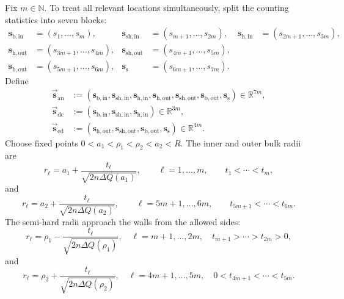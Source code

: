 \documentclass[a4paper]{article}
\newcommand{\R}{\mathbb{R}}
\newcommand{\N}{\mathbb{N}}
\numberwithin{equation}{section}
\begin{document}
Fix $m\in\N$.  To treat all relevant locations simultaneously, split the counting statistics into seven blocks:
\begin{align*}
\boldsymbol s_{\mathrm{b,in}}&=(s_1,\ldots,s_m),
&\boldsymbol s_{\mathrm{sh,in}}&=(s_{m+1},\ldots,s_{2m}),
&\boldsymbol s_{\mathrm{h,in}}&=(s_{2m+1},\ldots,s_{3m}),
\\
\boldsymbol s_{\mathrm{h,out}}&=(s_{3m+1},\ldots,s_{4m}),
&\boldsymbol s_{\mathrm{sh,out}}&=(s_{4m+1},\ldots,s_{5m}),
\\
\boldsymbol s_{\mathrm{b,out}}&=(s_{5m+1},\ldots,s_{6m}),
&\boldsymbol s_{\mathrm{s}}&=(s_{6m+1},\ldots,s_{7m}).
\end{align*}
Define
\begin{align}
\vec{\boldsymbol{s}}_{\mathrm{an}}
&:=(\boldsymbol s_{\mathrm{b,in}},\boldsymbol s_{\mathrm{sh,in}},\boldsymbol s_{\mathrm{h,in}},\boldsymbol s_{\mathrm{h,out}},\boldsymbol s_{\mathrm{sh,out}},\boldsymbol s_{\mathrm{b,out}},\boldsymbol s_{\mathrm{s}})\in\R^{7m},
\\
\vec{\boldsymbol{s}}_{\mathrm{dc}}
&:=(\boldsymbol s_{\mathrm{b,in}},\boldsymbol s_{\mathrm{sh,in}},\boldsymbol s_{\mathrm{h,in}})\in\R^{3m},
\\
\vec{\boldsymbol{s}}_{\mathrm{cd}}
&:=(\boldsymbol s_{\mathrm{h,out}},\boldsymbol s_{\mathrm{sh,out}},\boldsymbol s_{\mathrm{b,out}},\boldsymbol s_{\mathrm{s}})\in\R^{4m}.
\end{align}
Choose fixed points $0<a_1<\rho_1<\rho_2<a_2<R$.  The inner and outer bulk radii are
\begin{equation}
\label{def of mergin radii inside bulk}
r_\ell=a_1+\frac{t_\ell}{\sqrt{2n\Delta Q(a_1)}},
\qquad \ell=1,\ldots,m,
\qquad t_1<\cdots<t_m,
\end{equation}
and
\begin{equation}
\label{def of mergin radii outside bulk}
r_\ell=a_2+\frac{t_\ell}{\sqrt{2n\Delta Q(a_2)}},
\qquad \ell=5m+1,\ldots,6m,
\qquad t_{5m+1}<\cdots<t_{6m}.
\end{equation}
The semi-hard radii approach the walls from the allowed sides:
\begin{equation}
\label{def of merging radii inside semi hard}
r_\ell=\rho_1-\frac{t_\ell}{\sqrt{2n\Delta Q(\rho_1)}},
\quad \ell=m+1,\ldots,2m,
\quad t_{m+1}>\cdots>t_{2m}>0,
\end{equation}
and
\begin{equation}
\label{def of merging radii outside semi hard}
r_\ell=\rho_2+\frac{t_\ell}{\sqrt{2n\Delta Q(\rho_2)}},
\quad \ell=4m+1,\ldots,5m,
\quad 0<t_{4m+1}<\cdots<t_{5m}.
\end{equation}
\end{document}
